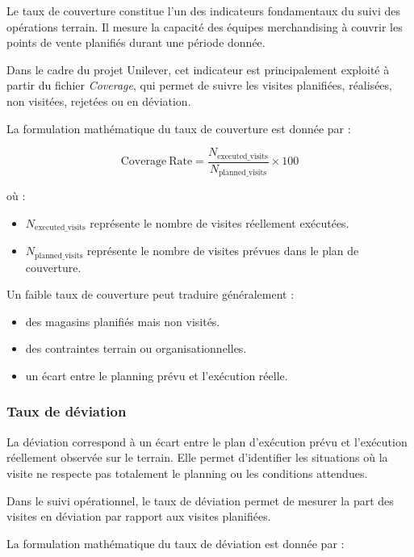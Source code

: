 Le taux de couverture constitue l’un des indicateurs fondamentaux du suivi des opérations terrain. Il mesure la capacité des équipes merchandising à couvrir les points de vente planifiés durant une période donnée.

Dans le cadre du projet Unilever, cet indicateur est principalement exploité à partir du fichier \textit{Coverage}, qui permet de suivre les visites planifiées, réalisées, non visitées, rejetées ou en déviation.

La formulation mathématique du taux de couverture est donnée par :

\[
\mathrm{Coverage\ Rate} =
\frac{N_{\mathrm{executed\_visits}}}
{N_{\mathrm{planned\_visits}}}
\times 100
\]

où :

\begin{itemize}
    \item $N_{\mathrm{executed\_visits}}$ représente le nombre de visites réellement exécutées.
    \item $N_{\mathrm{planned\_visits}}$ représente le nombre de visites prévues dans le plan de couverture.
\end{itemize}

Un faible taux de couverture peut traduire généralement :

\begin{itemize}
    \item des magasins planifiés mais non visités.
    \item des contraintes terrain ou organisationnelles.
    \item un écart entre le planning prévu et l’exécution réelle.
\end{itemize}


\subsubsection{Taux de déviation}

La déviation correspond à un écart entre le plan d’exécution prévu et l’exécution réellement observée sur le terrain. Elle permet d’identifier les situations où la visite ne respecte pas totalement le planning ou les conditions attendues.

Dans le suivi opérationnel, le taux de déviation permet de mesurer la part des visites en déviation par rapport aux visites planifiées.

La formulation mathématique du taux de déviation est donnée par :

